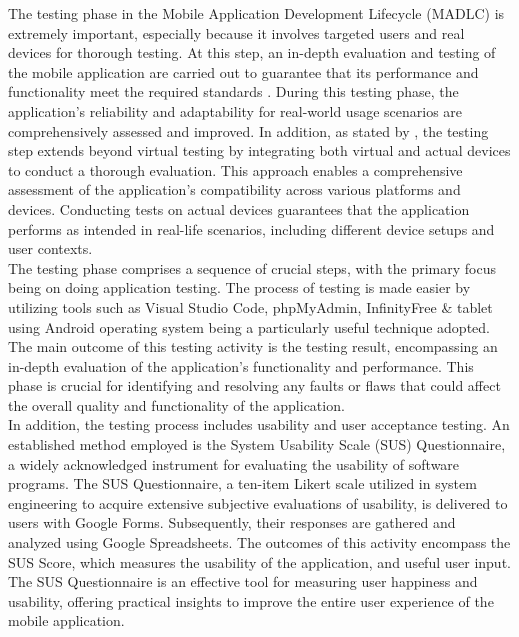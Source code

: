 The testing phase in the Mobile Application Development Lifecycle (MADLC) is extremely important, especially because it involves targeted users and real devices for thorough testing. At this step, an in-depth evaluation and testing of the mobile application are carried out to guarantee that its performance and functionality meet the required standards \parencite{shanmugam19}. During this testing phase, the application's reliability and adaptability for real-world usage scenarios are comprehensively assessed and improved. In addition, as stated by \textcite{wambua23}, the testing step extends beyond virtual testing by integrating both virtual and actual devices to conduct a thorough evaluation. This approach enables a comprehensive assessment of the application's compatibility across various platforms and devices. Conducting tests on actual devices guarantees that the application performs as intended in real-life scenarios, including different device setups and user contexts. \\

The testing phase comprises a sequence of crucial steps, with the primary focus being on doing application testing. The process of testing is made easier by utilizing tools such as Visual Studio Code, phpMyAdmin, InfinityFree \& tablet using Android operating system being a particularly useful technique adopted. The main outcome of this testing activity is the testing result, encompassing an in-depth evaluation of the application's functionality and performance. This phase is crucial for identifying and resolving any faults or flaws that could affect the overall quality and functionality of the application. \\

In addition, the testing process includes usability and user acceptance testing. An established method employed is the System Usability Scale (SUS) Questionnaire, a widely acknowledged instrument for evaluating the usability of software programs. The SUS Questionnaire, a ten-item Likert scale utilized in system engineering to acquire extensive subjective evaluations of usability, is delivered to users with Google Forms. Subsequently, their responses are gathered and analyzed using Google Spreadsheets. The outcomes of this activity encompass the SUS Score, which measures the usability of the application, and useful user input. The SUS Questionnaire is an effective tool for measuring user happiness and usability, offering practical insights to improve the entire user experience of the mobile application. \\

